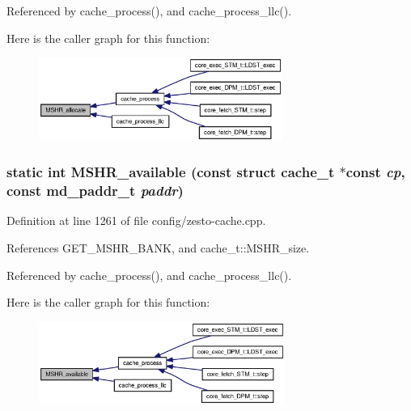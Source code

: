 Referenced by cache\_\-process(), and cache\_\-process\_\-llc().

Here is the caller graph for this function:\nopagebreak
\begin{figure}[H]
\begin{center}
\leavevmode
\includegraphics[width=226pt]{config_2zesto-cache_8cpp_b9e90f1afc77db8eb4dad712b12304ac_icgraph}
\end{center}
\end{figure}
\subsubsection[{MSHR\_\-available}]{\setlength{\rightskip}{0pt plus 5cm}static int MSHR\_\-available (const struct {\bf cache\_\-t} $\ast$const  {\em cp}, \/  const {\bf md\_\-paddr\_\-t} {\em paddr})\hspace{0.3cm}{\tt  [inline, static]}}\label{config_2zesto-cache_8cpp_eb1b85c3ab5d1ac1520577d21fd09dee}




Definition at line 1261 of file config/zesto-cache.cpp.

References GET\_\-MSHR\_\-BANK, and cache\_\-t::MSHR\_\-size.

Referenced by cache\_\-process(), and cache\_\-process\_\-llc().

Here is the caller graph for this function:\nopagebreak
\begin{figure}[H]
\begin{center}
\leavevmode
\includegraphics[width=228pt]{config_2zesto-cache_8cpp_eb1b85c3ab5d1ac1520577d21fd09dee_icgraph}
\end{center}
\end{figure}
